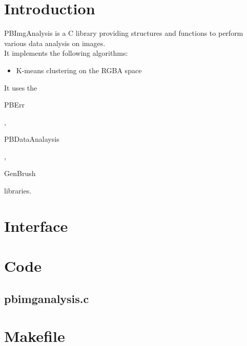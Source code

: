 \section*{Introduction}

PBImgAnalysis is a C library providing structures and functions to perform various data analysis on images.\\ 

It implements the following algorithms:
\begin{itemize}
\item K-means clustering on the RGBA space
\end{itemize}

It uses the \begin{ttfamily}PBErr\end{ttfamily}, \begin{ttfamily}PBDataAnalaysis\end{ttfamily}, \begin{ttfamily}GenBrush\end{ttfamily} libraries.\\

\section{Interface}

\begin{scriptsize}
\begin{ttfamily}

\end{ttfamily}
\end{scriptsize}

\section{Code}

\subsection{pbimganalysis.c}

\begin{scriptsize}
\begin{ttfamily}

\end{ttfamily}
\end{scriptsize}

\section{Makefile}

